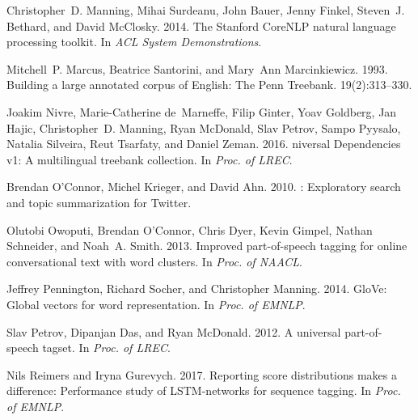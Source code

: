 \documentclass[11pt,a4paper]{article}
\begin{document}
\begin{thebibliography}{}
	Christopher~D. Manning, Mihai Surdeanu, John Bauer, Jenny Finkel, Steven~J.
	Bethard, and David McClosky. 2014.
	\newblock The {Stanford} {CoreNLP} natural language processing toolkit.
	\newblock In {\em ACL System Demonstrations\/}.
	
	Mitchell~P. Marcus, Beatrice Santorini, and Mary~Ann Marcinkiewicz. 1993.
	\newblock Building a large annotated corpus of {E}nglish: The {P}enn
	{T}reebank.
	 19(2):313--330.
	
	Joakim Nivre, Marie-Catherine de~Marneffe, Filip Ginter, Yoav Goldberg, Jan
	Hajic, Christopher~D. Manning, Ryan McDonald, Slav Petrov, Sampo Pyysalo,
	Natalia Silveira, Reut Tsarfaty, and Daniel Zeman. 2016.
	niversal {D}ependencies v1: A multilingual treebank collection.
	\newblock In {\em Proc. of LREC\/}.
	
	Brendan O'Connor, Michel Krieger, and David Ahn. 2010.
	: Exploratory search and topic summarization for
	{T}witter.
	
	Olutobi Owoputi, Brendan O'Connor, Chris Dyer, Kevin Gimpel, Nathan Schneider,
	and Noah~A. Smith. 2013.
	\newblock Improved part-of-speech tagging for online conversational text with
	word clusters.
	\newblock In {\em Proc. of NAACL\/}.
	
	Jeffrey Pennington, Richard Socher, and Christopher Manning. 2014.
	\newblock Glo{V}e: Global vectors for word representation.
	\newblock In {\em Proc. of EMNLP\/}.
	
	Slav Petrov, Dipanjan Das, and Ryan McDonald. 2012.
	\newblock A universal part-of-speech tagset.
	\newblock In {\em Proc. of LREC\/}.
	
	Nils Reimers and Iryna Gurevych. 2017.
	\newblock Reporting score distributions makes a difference: Performance study
	of {LSTM}-networks for sequence tagging.
	\newblock In {\em Proc. of EMNLP\/}.
	

\end{thebibliography}
\end{document}
